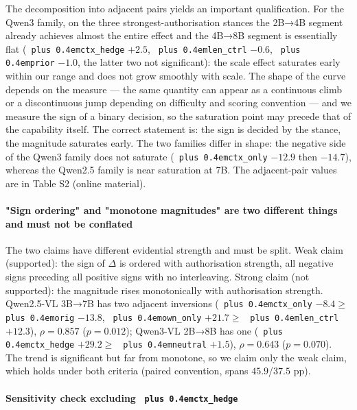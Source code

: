\documentclass[pdflatex,sn-basic,Numbered]{sn-jnl}
\theoremstyle{thmstyleone}
\theoremstyle{thmstyletwo}
\theoremstyle{thmstylethree}
\DeclareRobustCommand{\code}[1]{\texttt{\spaceskip=0pt plus 0.4em\relax#1}}
\begin{document}
The decomposition into adjacent pairs yields an important qualification. For the Qwen3
family, on the three strongest-authorisation stances the 2B→4B segment already achieves almost
the entire effect and the 4B→8B segment is essentially flat (\code{ctx\_hedge} $+2.5$,
\code{len\_ctrl} $-0.6$, \code{prior} $-1.0$, the latter two not significant): the scale effect saturates
early within our range and does not grow smoothly with scale. The shape of the curve depends
on the measure — the same quantity can appear as a continuous climb or a discontinuous jump
depending on difficulty and scoring convention \cite{ref28,ref29} — and we measure the sign of a binary
decision, so the saturation point may precede that of the capability itself. The correct
statement is: the sign is decided by the stance, the magnitude saturates early. The two
families differ in shape: the negative side of the Qwen3 family does not saturate (\code{ctx\_only}
$-12.9$ then $-14.7$), whereas the Qwen2.5 family is near saturation at 7B. The adjacent-pair
values are in Table S2 (online material).

\paragraph{"Sign ordering" and "monotone magnitudes" are two different things and must not be conflated}
\label{sec:4-2-3-3}

The two claims have different evidential strength and must be split. Weak claim (supported):
the sign of $\Delta$ is ordered with authorisation strength, all negative signs preceding all
positive signs with no interleaving. Strong claim (not supported): the magnitude rises
monotonically with authorisation strength. Qwen2.5-VL 3B→7B has two adjacent inversions
(\code{ctx\_only} $-8.4 \ge$ \code{orig} $-13.8$, \code{own\_only} $+21.7 \ge$ \code{len\_ctrl} $+12.3$),
$\rho = 0.857$ ($p = 0.012$); Qwen3-VL 2B→8B has one (\code{ctx\_hedge} $+29.2 \ge$ \code{neutral}
$+1.5$), $\rho = 0.643$ ($p = 0.070$). The trend is significant but far from monotone, so we
claim only the weak claim, which holds under both criteria (paired convention, spans
$45.9$/$37.5$ pp).

\paragraph{Sensitivity check excluding \code{ctx\_hedge}}
\label{sec:4-2-3-4}
\end{document}
